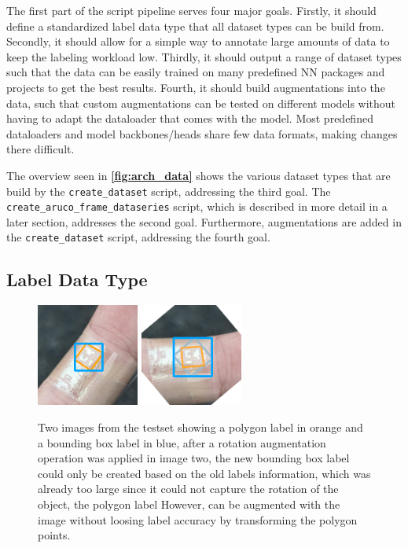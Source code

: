\documentclass[10pt]{book}
\newcommand{\figureref}[1]{\textbf{\autoref{#1}}}
\begin{document}
The first part of the script pipeline serves four major goals. Firstly, it should define a standardized label data type that all dataset types can be build from. Secondly, it should allow for a simple way to annotate large amounts of data to keep the labeling workload low. Thirdly, it should output a range of dataset types such that the data can be easily trained on many predefined \ac{NN} packages and projects to get the best results. Fourth, it should build augmentations into the data, such that custom augmentations can be tested on different models without having to adapt the dataloader that comes with the model. Most predefined dataloaders and model backbones/heads share few data formats, making changes there difficult.

The overview seen in \figureref{fig:arch_data} shows the various dataset types that are build by the \texttt{create\_dataset} script, addressing the third goal. The \texttt{create\_aruco\_frame\_dataseries} script, which is described in more detail in a later section, addresses the second goal. Furthermore, augmentations are added in the \texttt{create\_dataset} script, addressing the fourth goal.

\subsection{Label Data Type}

\begin{figure}
  \centering
     {\includegraphics[width=0.3\textwidth]{image/polygon_pog_1}}
     {\includegraphics[width=0.3\textwidth]{image/polygon_pog_2}}
  \caption{Two images from the testset showing a polygon label in orange and a bounding box label in blue, after a rotation augmentation operation was applied in image two, the new bounding box label could only be created based on the old labels information, which was already too large since it could not capture the rotation of the object, the polygon label However, can be augmented with the image without loosing label accuracy by transforming the polygon points.}
  \label{fig:polygon-good}
\end{figure}
\end{document}
